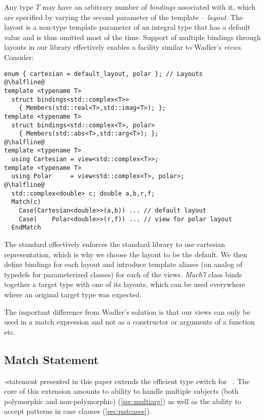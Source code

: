 Any type $T$ may have an arbitrary number of \emph{bindings} associated with it, 
which are specified by varying the second parameter of the  
template -- \emph{layout}. The layout is a non-type template parameter of an 
integral type that has a default value and is thus omitted most of the time.
Support of multiple bindings through layouts in our library effectively enables 
a facility similar to Wadler's \emph{views}\cite{Wadler87}. Consider:

\begin{lstlisting}
enum { cartesian = default_layout, polar }; // Layouts
@\halfline@
template <typename T> 
  struct bindings<std::complex<T>>
    { Members(std::real<T>,std::imag<T>); };
template <typename T> 
  struct bindings<std::complex<T>, polar>
    { Members(std::abs<T>,std::arg<T>); };
@\halfline@
template <typename T> 
  using Cartesian = view<std::complex<T>>;
template <typename T> 
  using Polar     = view<std::complex<T>, polar>;
@\halfline@
  std::complex<double> c; double a,b,r,f;
  Match(c)
    Case(Cartesian<double>>(a,b)) ... // default layout
    Case(    Polar<double>>(r,f)) ... // view for polar layout
  EndMatch
\end{lstlisting}

\noindent
The \Cpp{} standard effectively enforces the standard library to use cartesian 
representation\cite[-4]{C++11}, which is why we choose the 
 layout to be the default. We then define bindings for each 
layout and introduce template aliases (an analog of typedefs for parameterized 
classes) for each of the views. \emph{Mach7} class  binds together a 
target type with one of its layouts, which can be used everywhere where an 
original target type was expected.

The important difference from Wadler's solution is that our views can only be 
used in a match expression and not as a constructor or arguments of a function 
etc.

\subsection{Match Statement}
\label{sec:matchstmt}

-statement presented in this paper extends the efficient type switch 
for \Cpp{}~\cite{TS12}. The core of this extension amounts to ability to handle 
multiple subjects (both polymorphic and non-polymorphic) 
(\textsection\ref{sec:multiarg}) as well as the ability to accept patterns in 
case clauses (\textsection\ref{sec:patcases}).

